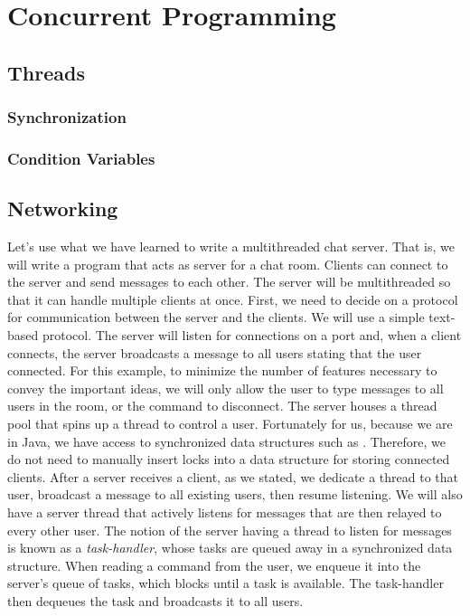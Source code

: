 \section{Concurrent Programming}

\subsection*{Threads}

\subsubsection*{Synchronization}

\subsubsection*{Condition Variables}

\subsection*{Networking}

\example Let's use what we have learned to write a multithreaded chat server. That is, we will write a program that acts as server for a chat room. Clients can connect to the server and send messages to each other. The server will be multithreaded so that it can handle multiple clients at once. First, we need to decide on a protocol for communication between the server and the clients. We will use a simple text-based protocol. The server will listen for connections on a port and, when a client connects, the server broadcasts a message to all users stating that the user connected. For this example, to minimize the number of features necessary to convey the important ideas, we will only allow the user to type messages to all users in the room, or the  command to disconnect. The server houses a thread pool that spins up a thread to control a user. Fortunately for us, because we are in Java, we have access to synchronized data structures such as . Therefore, we do not need to manually insert locks into a data structure for storing connected clients. After a server receives a client, as we stated, we dedicate a thread to that user, broadcast a message to all existing users, then resume listening. We will also have a server thread that actively listens for messages that are then relayed to every other user. The notion of the server having a thread to listen for messages is known as a \textit{task-handler}, whose tasks are queued away in a synchronized  data structure. When reading a command from the user, we enqueue it into the server's queue of tasks, which blocks until a task is available. The task-handler then dequeues the task and broadcasts it to all users.

